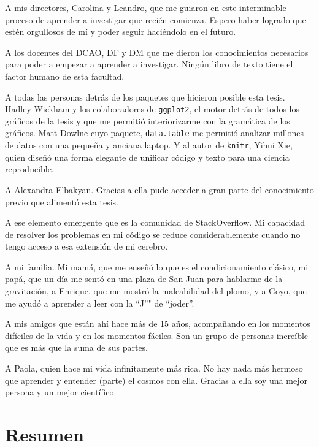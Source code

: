 \documentclass[spanish,a4paper,12pt,oneside]{book}
\begin{document}
A mis directores, Carolina y Leandro, que me guiaron en este
interminable proceso de aprender a investigar que recién comienza.
Espero haber logrado que estén orgullosos de mí y poder seguir
haciéndolo en el futuro.

A los docentes del DCAO, DF y DM que me dieron los conocimientos
necesarios para poder a empezar a aprender a investigar. Ningún libro de
texto tiene el factor humano de esta facultad.

A todas las personas detrás de los paquetes que hicieron posible esta
tesis. Hadley Wickham y los colaboradores de \texttt{ggplot2}, el motor
detrás de todos los gráficos de la tesis y que me permitió
interiorizarme con la gramática de los gráficos. Matt Dowlne cuyo
paquete, \texttt{data.table} me permitió analizar millones de datos con
una pequeña y anciana laptop. Y al autor de \texttt{knitr}, Yihui Xie,
quien diseñó una forma elegante de unificar código y texto para una
ciencia reproducible.

A Alexandra Elbakyan. Gracias a ella pude acceder a gran parte del
conocimiento previo que alimentó esta tesis.

A ese elemento emergente que es la comunidad de StackOverflow. Mi
capacidad de resolver los problemas en mi código se reduce
considerablemente cuando no tengo acceso a esa extensión de mi cerebro.

A mi familia. Mi mamá, que me enseñó lo que es el condicionamiento
clásico, mi papá, que un día me sentó en una plaza de San Juan para
hablarme de la gravitación, a Enrique, que me mostró la maleabilidad del
plomo, y a Goyo, que me ayudó a aprender a leer con la ``J''" de
``joder''.

A mis amigos que están ahí hace más de 15 años, acompañando en los
momentos difíciles de la vida y en los momentos fáciles. Son un grupo de
personas increíble que es más que la suma de sus partes.

A Paola, quien hace mi vida infinitamente más rica. No hay nada más
hermoso que aprender y entender (parte) el cosmos con ella. Gracias a
ella soy una mejor persona y un mejor científico.

\newpage

 \chapter*{Resumen}
\end{document}

